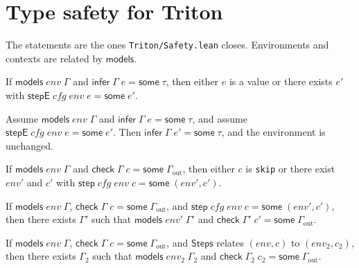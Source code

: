\documentclass[a4paper,UKenglish,anonymous,cleveref,autoref]{lipics-v2021}
\begin{document}
\section{Type safety for Triton}
\label{sec:triton-safe}

The statements are the ones \texttt{Triton/Safety.lean} closes.
Environments and contexts are related by \(\mathsf{models}\).

\begin{theorem}
\label{thm:eprog}
If \(\mathsf{models}\;\mathit{env}\;\Gamma\) and \(\mathsf{infer}\;\Gamma\;e = \mathsf{some}\;\tau\), then either \(e\) is a value or there exists \(e'\) with \(\mathsf{stepE}\;\mathit{cfg}\;\mathit{env}\;e = \mathsf{some}\;e'\).
\end{theorem}

\begin{theorem}
\label{thm:epres}
Assume \(\mathsf{models}\;\mathit{env}\;\Gamma\) and \(\mathsf{infer}\;\Gamma\;e = \mathsf{some}\;\tau\), and assume \(\mathsf{stepE}\;\mathit{cfg}\;\mathit{env}\;e = \mathsf{some}\;e'\).
Then \(\mathsf{infer}\;\Gamma\;e' = \mathsf{some}\;\tau\), and the environment is unchanged.
\end{theorem}

\begin{theorem}
\label{thm:prog}
If \(\mathsf{models}\;\mathit{env}\;\Gamma\) and \(\mathsf{check}\;\Gamma\;c = \mathsf{some}\;\Gamma_{\mathrm{out}}\), then either \(c\) is \texttt{skip} or there exist \(\mathit{env}'\) and \(c'\) with \(\mathsf{step}\;\mathit{cfg}\;\mathit{env}\;c = \mathsf{some}\;(\mathit{env}', c')\).
\end{theorem}

\begin{theorem}
\label{thm:pres}
If \(\mathsf{models}\;\mathit{env}\;\Gamma\), \(\mathsf{check}\;\Gamma\;c = \mathsf{some}\;\Gamma_{\mathrm{out}}\), and \(\mathsf{step}\;\mathit{cfg}\;\mathit{env}\;c = \mathsf{some}\;(\mathit{env}', c')\), then there exists \(\Gamma'\) such that \(\mathsf{models}\;\mathit{env}'\;\Gamma'\) and \(\mathsf{check}\;\Gamma'\;c' = \mathsf{some}\;\Gamma_{\mathrm{out}}\).
\end{theorem}

\begin{theorem}
\label{thm:safe}
If \(\mathsf{models}\;\mathit{env}\;\Gamma\), \(\mathsf{check}\;\Gamma\;c = \mathsf{some}\;\Gamma_{\mathrm{out}}\), and \(\mathsf{Steps}\) relates \((\mathit{env}, c)\) to \((\mathit{env}_2, c_2)\), then there exists \(\Gamma_2\) such that \(\mathsf{models}\;\mathit{env}_2\;\Gamma_2\) and \(\mathsf{check}\;\Gamma_2\;c_2 = \mathsf{some}\;\Gamma_{\mathrm{out}}\).
\end{theorem}
\end{document}
